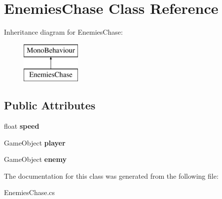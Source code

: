 \hypertarget{class_enemies_chase}{}\section{Enemies\+Chase Class Reference}
\label{class_enemies_chase}
Inheritance diagram for Enemies\+Chase\+:\begin{figure}[H]
\begin{center}
\leavevmode
\includegraphics[height=2.000000cm]{class_enemies_chase}
\end{center}
\end{figure}
\subsection*{Public Attributes}
\begin{DoxyCompactItemize}
\item 
\hypertarget{class_enemies_chase_a00dbfcc4c86b3d505e4119d687423d9e}{}\label{class_enemies_chase_a00dbfcc4c86b3d505e4119d687423d9e} 
float {\bfseries speed}
\item 
\hypertarget{class_enemies_chase_a9fd0c00922f4bd8dc44c67c972a9c0e3}{}\label{class_enemies_chase_a9fd0c00922f4bd8dc44c67c972a9c0e3} 
Game\+Object {\bfseries player}
\item 
\hypertarget{class_enemies_chase_a2c390ef44b3c3be24ee5b2ffaa083a2d}{}\label{class_enemies_chase_a2c390ef44b3c3be24ee5b2ffaa083a2d} 
Game\+Object {\bfseries enemy}
\end{DoxyCompactItemize}


The documentation for this class was generated from the following file\+:\begin{DoxyCompactItemize}
\item 
Enemies\+Chase.\+cs\end{DoxyCompactItemize}
